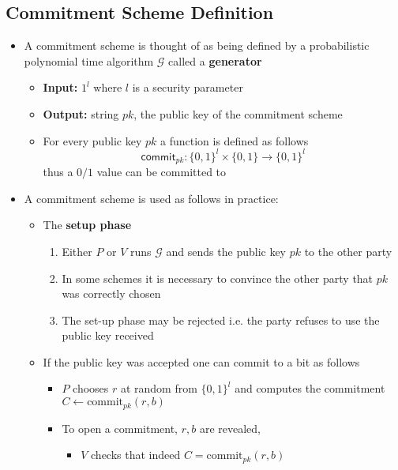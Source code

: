\subsection{Commitment Scheme Definition}
\begin{itemize}
  \item A commitment scheme is thought of as being defined by a probabilistic polynomial time algorithm $\mathcal G$ called a \textbf{generator}
  \begin{itemize}
  	\item \textbf{Input:} $1^l$ where $l$ is a security parameter
  	\item \textbf{Output:} string $pk$, the public key of the commitment scheme
  	\item For every public key $pk$ a function is defined as follows
    \[
      \mathsf{commit}_{pk}: \{0,1\}^l \times \{0,1\} \rightarrow \{0,1\}^l
    \] 
		thus a $0/1$ value can be committed to
  \end{itemize}
  \item A commitment scheme is used as follows in practice:
  \begin{itemize}
    \item The \textbf{setup phase}
    \begin{enumerate}
      \item Either $P$ or $V$ runs $\mathcal G$ and sends the public key $pk$ to the other party
      \item In some schemes it is necessary to convince the other party that $pk$ was correctly chosen
      \item The set-up phase may be rejected i.e. the party refuses to use the public key received 
    \end{enumerate}
    \item If the public key was accepted one can commit to a bit as follows
    \begin{itemize}
      \item $P$ chooses $r$ at random from $\{0,1\}^l$ and computes the commitment $C \leftarrow \text{commit}_{pk}(r,b)$
      \item To open a commitment, $r,b$ are revealed,
      \begin{itemize}
        \item $V$ checks that indeed $C = \text{commit}_{pk} (r,b)$
      \end{itemize}
    \end{itemize}
  \end{itemize}
\end{itemize}

